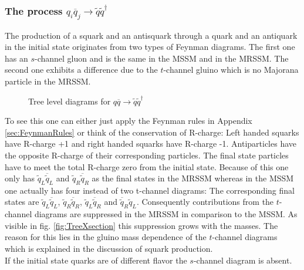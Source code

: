 \subsubsection*{The process $q_i \overline{q}_j \to \tilde{q}\tilde{q}^\dagger$}
The production of a squark and an antisquark through a quark and an antiquark in the initial state originates from two types of Feynman diagrams. The first one has an $s$-channel gluon and is the same in the MSSM and in the MRSSM. The second one exhibits a difference due to the $t$-channel gluino which is no Majorana particle in the MRSSM. 
\begin{figure}[!htbp]
\begin{center}
\caption{Tree level diagrams for $q\overline{q} \to \tilde{q}\tilde{q}^\dagger$}
\end{center}
\end{figure}
To see this one can either just apply the Feynman rules in Appendix \ref{sec:FeynmanRules} or think of the conservation of R-charge: Left handed squarks have R-charge +1 and right handed squarks have R-charge -1. Antiparticles have the opposite R-charge of their corresponding particles. The final state particles have to meet the total R-charge zero from the initial state. Because of this one only has $\tilde{q}_L \overline{\tilde{q}}_L$ and $\tilde{q}_R \overline{\tilde{q}}_R$ as the final states in the MRSSM whereas in the MSSM one actually has four instead of two t-channel diagrams: The corresponding final states are $\tilde{q}_L \overline{\tilde{q}}_L$, $\tilde{q}_R \overline{\tilde{q}}_R$, $\tilde{q}_L \overline{\tilde{q}}_R$ and $\overline{\tilde{q}}_R \tilde{q}_L$. Consequently contributions from the $t$-channel diagrams are suppressed in the MRSSM in comparison to the MSSM. As visible in fig. \ref{fig:TreeXsection} this suppression grows with the masses. The reason for this lies in the gluino mass dependence of the $t$-channel diagrams which is explained in the discussion of squark production.\\
If the initial state quarks are of different flavor the $s$-channel diagram is absent.

